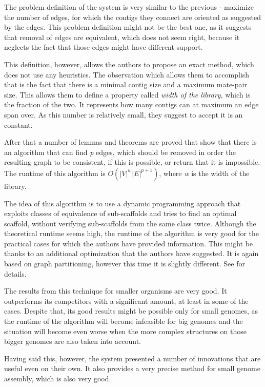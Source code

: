 \documentclass[11pt]{article}
\begin{document}
The problem definition of the system is very similar to the previous - maximize
the number of edges, for which the contigs they connect are oriented as
suggested by the edges. This problem definition might not be the best one, as it
suggests that removal of edges are equivalent, which does not seem right,
because it neglects the fact that those edges might have different support.

This definition, however, allows the authors to propose an exact method, which
does not use any heuristics. The observation which allows them to accomplish
that is the fact that there is a minimal contig size and a maximum mate-pair size.
This allows them to define a property called \emph{width of the library}, which
is the fraction of the two. It represents how many contigs can at maximum an
edge span over. As this number is relatively small, they suggest to accept it is
an constant.

After that a number of lemmas and theorems are proved that show that there is an
algorithm that can find \emph{p} edges, which should be removed in order the
resulting graph to be consistent, if this is possible, or return that it is
impossible. The runtime of this algorithm is $O(|V|^w |E|^{p + 1})$, where
\emph{w} is the width of the library.

The idea of this algorithm is to use a dynamic programming approach that
exploits classes of equivalence of sub-scaffolds and tries to find an optimal
scaffold, without verifying sub-scaffolds from the same class twice. Although
the theoretical runtime seems high, the runtime of the algorithm is very good
for the practical cases for which the authors have provided information. This
might be thanks to an additional optimization that the authors have suggested.
It is again based on graph partitioning, however this time it is slightly
different. See \cite{Opera} for details.

The results from this technique for smaller organisms are very good. It
outperforms its competitors with a significant amount, at least in some of the
cases. Despite that, its good results might be possible only for small genomes,
as the runtime of the algorithm will become infeasible for big genomes and the
situation will become even worse when the more complex structures on those
bigger genomes are also taken into account.

Having said this, however, the system presented a number of innovations that are
useful even on their own. It also provides a very precise method for small
genome assembly, which is also very good.
\end{document}

